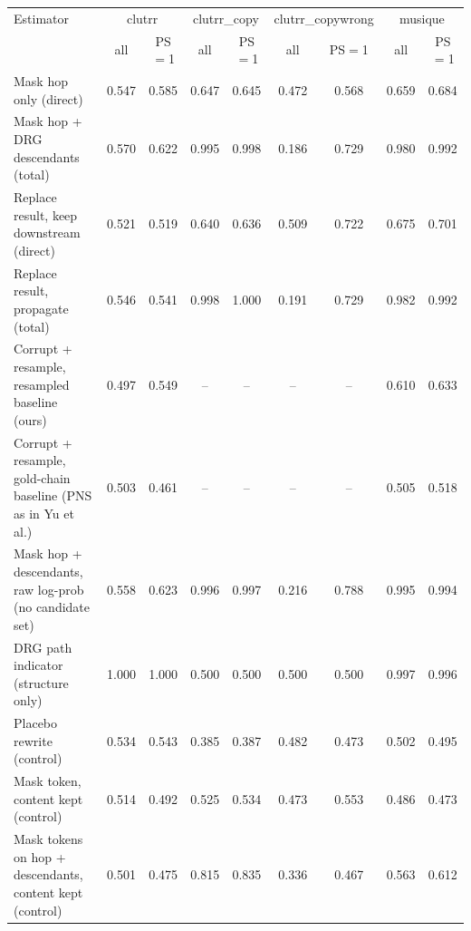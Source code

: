 \begin{tabular}{lcccccccc}
\toprule
Estimator & \multicolumn{2}{c}{clutrr} & \multicolumn{2}{c}{clutrr\_copy} & \multicolumn{2}{c}{clutrr\_copywrong} & \multicolumn{2}{c}{musique} \\
 & all & PS$=$1 & all & PS$=$1 & all & PS$=$1 & all & PS$=$1 \\
\midrule
Mask hop only (direct) & 0.547 & 0.585 & 0.647 & 0.645 & 0.472 & 0.568 & 0.659 & 0.684 \\
Mask hop + DRG descendants (total) & 0.570 & 0.622 & 0.995 & 0.998 & 0.186 & 0.729 & 0.980 & 0.992 \\
Replace result, keep downstream (direct) & 0.521 & 0.519 & 0.640 & 0.636 & 0.509 & 0.722 & 0.675 & 0.701 \\
Replace result, propagate (total) & 0.546 & 0.541 & 0.998 & 1.000 & 0.191 & 0.729 & 0.982 & 0.992 \\
Corrupt + resample, resampled baseline (ours) & 0.497 & 0.549 & -- & -- & -- & -- & 0.610 & 0.633 \\
Corrupt + resample, gold-chain baseline (PNS as in Yu et al.) & 0.503 & 0.461 & -- & -- & -- & -- & 0.505 & 0.518 \\
Mask hop + descendants, raw log-prob (no candidate set) & 0.558 & 0.623 & 0.996 & 0.997 & 0.216 & 0.788 & 0.995 & 0.994 \\
DRG path indicator (structure only) & 1.000 & 1.000 & 0.500 & 0.500 & 0.500 & 0.500 & 0.997 & 0.996 \\
Placebo rewrite (control) & 0.534 & 0.543 & 0.385 & 0.387 & 0.482 & 0.473 & 0.502 & 0.495 \\
Mask token, content kept (control) & 0.514 & 0.492 & 0.525 & 0.534 & 0.473 & 0.553 & 0.486 & 0.473 \\
Mask tokens on hop + descendants, content kept (control) & 0.501 & 0.475 & 0.815 & 0.835 & 0.336 & 0.467 & 0.563 & 0.612 \\
\bottomrule
\end{tabular}
